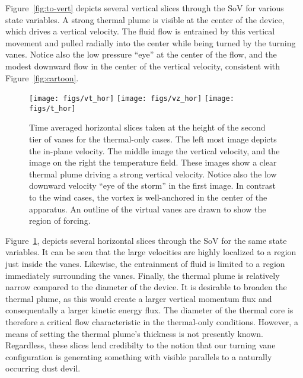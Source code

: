 %
%
%
Figure~\ref{fig:to-vert} depicts several vertical slices through the SoV
for various state variables. A strong thermal plume is visible at the
center of the device, which drives a vertical velocity. The fluid flow
is entrained by this vertical movement and pulled radially into the
center while being turned by the turning vanes. Notice also the low
pressure ``eye'' at the center of the flow, and the modest downward flow
in the center of the vertical velocity, consistent with
Figure~\ref{fig:cartoon}. 

\begin{figure}[htb]

 \centering
  \texttt{[image: figs/vt\_hor]}
 \hfill
  \texttt{[image: figs/vz\_hor]}
 \hfill
  \texttt{[image: figs/t\_hor]}
 \caption{Time averaged horizontal slices taken at the height of the
 second tier of vanes for the thermal-only cases. The left most image
 depicts the in-plane velocity. The middle image the vertical velocity,
 and the image on the right the temperature field. These images show a
 clear thermal plume driving a strong vertical velocity. Notice also the
 low downward velocity ``eye of the storm'' in the first image. In
 contrast to the wind cases, the vortex is well-anchored in the center
 of the apparatus. An outline of the virtual vanes are drawn to show the
 region of forcing.}
 \label{fig:to-hor}
\end{figure}

Figure~\ref{fig:to-hor}, depicts several horizontal slices
through the SoV for the same state variables. It can be seen that the
large velocities are highly localized to a region just inside the
vanes. Likewise, the entrainment of fluid is limited to a region
immediately surrounding the vanes.
%
%
Finally, the thermal plume is relatively narrow compared to the diameter
of the device. It is desirable to broaden the thermal plume, as this
would create a larger vertical momentum flux and consequentally a larger
kinetic energy flux.  
The diameter of the thermal core is therefore a critical flow
characteristic in the thermal-only conditions. However, a means of
setting the thermal plume's thickness is not presently 
known. Regardless, these slices lend credibilty to the 
notion that our turning vane configuration is generating something with 
visible parallels to a naturally occurring dust devil.   

